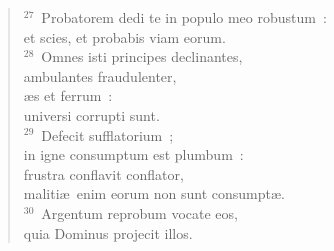 \begin{flushleft}
\begin{verse}
${}^{27}$~Probatorem dedi te in populo meo robustum~:\\ et scies, et probabis viam eorum.\\
${}^{28}$~Omnes isti principes declinantes,\\ ambulantes fraudulenter,\\ \ae s et ferrum~:\\ universi corrupti sunt.\\
${}^{29}$~Defecit sufflatorium~;\\ in igne consumptum est plumbum~:\\ frustra conflavit conflator,\\ maliti\ae\ enim eorum non sunt consumpt\ae .\\
${}^{30}$~Argentum reprobum vocate eos,\\ quia Dominus projecit illos.\end{verse}\end{flushleft}


